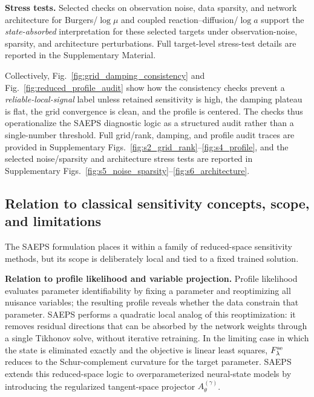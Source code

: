 \documentclass[preprint,12pt]{elsarticle}
\newcommand{\classlabel}[1]{\textnormal{\emph{#1}}}
\begin{document}
\medskip\noindent
\textbf{Stress tests.}
Selected checks on observation noise, data sparsity, and network architecture for Burgers/$\log\mu$ and coupled reaction--diffusion/$\log a$ support the \classlabel{state-absorbed} interpretation for these selected targets under observation-noise, sparsity, and architecture perturbations. Full target-level stress-test details are reported in the Supplementary Material.

Collectively, Fig.~\ref{fig:grid_damping_consistency} and Fig.~\ref{fig:reduced_profile_audit} show how the consistency checks prevent a \classlabel{reliable-local-signal} label unless retained sensitivity is high, the damping plateau is flat, the grid convergence is clean, and the profile is centered. The checks thus operationalize the SAEPS diagnostic logic as a structured audit rather than a single-number threshold. Full grid/rank, damping, and profile audit traces are provided in Supplementary Figs.~\ref{fig:s2_grid_rank}--\ref{fig:s4_profile}, and the selected noise/sparsity and architecture stress tests are reported in Supplementary Figs.~\ref{fig:s5_noise_sparsity}--\ref{fig:s6_architecture}.

\subsection{Relation to classical sensitivity concepts, scope, and limitations}

The SAEPS formulation places it within a family of reduced-space sensitivity methods, but its scope is deliberately local and tied to a fixed trained solution.

\medskip\noindent
\textbf{Relation to profile likelihood and variable projection.}
Profile likelihood evaluates parameter identifiability by fixing a parameter and reoptimizing all nuisance variables; the resulting profile reveals whether the data constrain that parameter. SAEPS performs a quadratic local analog of this reoptimization: it removes residual directions that can be absorbed by the network weights through a single Tikhonov solve, without iterative retraining. In the limiting case in which the state is eliminated exactly and the objective is linear least squares, $F_{\lambda}^{\rm se}$ reduces to the Schur-complement curvature for the target parameter. SAEPS extends this reduced-space logic to overparameterized neural-state models by introducing the regularized tangent-space projector $A_\theta^{(\gamma)}$.
\end{document}

